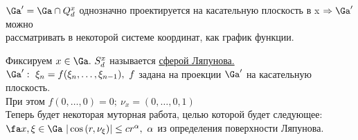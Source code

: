 \documentclass[a4paper,draft]{article}
\begin{document}
$\Ga'=\Ga\cap Q_d^x$ однозначно проектируется на касательную плоскость в x
$\Rightarrow \Ga'$ можно \\рассматривать в некоторой системе координат, как
график функции.


Фиксируем $x\in\Ga.\ S_d^x$ называется \underline{сферой Ляпунова.}\\
$\Ga':\ \xi_n=f(\xi_n,\dots,\xi_{n-1}),\ f$ задана на проекции $\Ga'$
на касательную плоскость.\\
При этом $f(0,\dots,0)=0;\ \nu_x=(0,\dots,0,1)$\\
Теперь будет некоторая муторная работа, целью которой будет следующее:\\
$\fa x,\xi\in\Ga\ |\cos{(r,\nu_\xi)}|\le cr^\alpha,\ \alpha$ из
определения поверхности Ляпунова.\\
\end{document}

